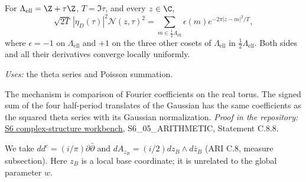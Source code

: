 \begin{announcement}\label{ari:C.8.8}
For $\Lambda_{\mathrm{ell}}=\Z+\tau\Z$, $T=\Im\tau$, and every $z\in\C$,
\[
 \sqrt{2T}\,|\eta_D(\tau)|^2\mathcal N(z,\tau)^2
 =\sum_{m\in\frac12\Lambda_{\mathrm{ell}}}\epsilon(m)
                         e^{-2\pi|z-m|^2/T},
\]
where $\epsilon=-1$ on $\Lambda_{\mathrm{ell}}$ and $+1$ on the three other
cosets of $\Lambda_{\mathrm{ell}}$ in $\frac12\Lambda_{\mathrm{ell}}$.
Both sides and all their derivatives converge locally uniformly.
\end{announcement}
\noindent\textit{Uses:} the theta series and Poisson summation.\par
The mechanism is comparison of Fourier coefficients on the real torus. The signed sum of the four half-period translates of the Gaussian has the same coefficients as the squared theta series with its Gaussian normalization.
\noindent\textit{Proof in the repository:} \href{https://github.com/KokunoYumeto/s6-complex-structure-workbench}{S6 complex-structure workbench}, S6\_05\_ARITHMETIC, Statement C.8.8.

We take $dd^c=(i/\pi)\partial\bar\partial$ and $dA_{z_B}=(i/2)dz_B\wedge d\bar z_B$ (ARI C.8, measure subsection). Here $z_B$ is a local base coordinate; it is unrelated to the global parameter $w$.

